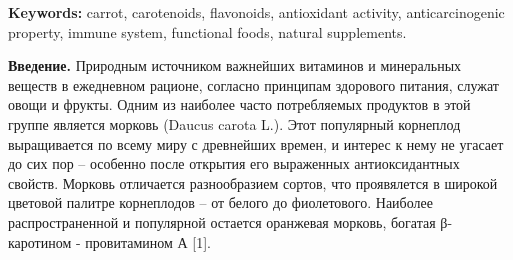 {\bfseries Keywords:} carrot, carotenoids, flavonoids, antioxidant
activity, anticarcinogenic property, immune system, functional foods,
natural supplements.

\begin{multicols}{2}
{\bfseries Введение.} Природным источником важнейших витаминов и
минеральных веществ в ежедневном рационе, согласно принципам здорового
питания, служат овощи и фрукты. Одним из наиболее часто потребляемых
продуктов в этой группе является морковь (Daucus carota L.). Этот
популярный корнеплод выращивается по всему миру с древнейших времен, и
интерес к нему не угасает до сих пор -- особенно после открытия его
выраженных антиоксидантных свойств. Морковь отличается разнообразием
сортов, что проявялется в широкой цветовой палитре корнеплодов -- от
белого до фиолетового. Наиболее распространенной и популярной остается
оранжевая морковь, богатая β-каротином - провитамином А {[}1{]}.
\end{multicols}


